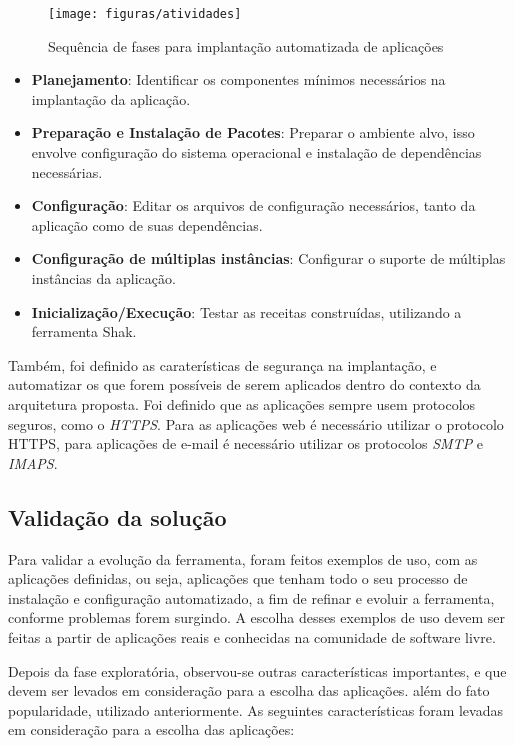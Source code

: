 \begin{figure}[h]
  \centering
  \texttt{[image: figuras/atividades]}
      \caption{Sequência de fases para implantação automatizada de aplicações}
  \label{fig:1}
\end{figure}

\begin{itemize}
  \item  \textbf{Planejamento}: Identificar os componentes mínimos necessários na implantação
 da aplicação.  
  \item  \textbf{Preparação e Instalação de Pacotes}: Preparar o ambiente alvo, 
isso envolve configuração do sistema operacional e instalação de dependências necessárias.
  \item  \textbf{Configuração}: Editar os arquivos de configuração necessários, tanto 
da aplicação como de suas dependências.
  \item  \textbf{Configuração de múltiplas instâncias}: Configurar o suporte de múltiplas instâncias
da aplicação.   
  \item  \textbf{Inicialização/Execução}: Testar as receitas construídas, utilizando
a ferramenta Shak. 
\end{itemize}

Também, foi definido as caraterísticas de segurança na implantação, e
automatizar os que forem possíveis de serem aplicados dentro do contexto da
arquitetura proposta. Foi definido que as aplicações sempre usem protocolos 
seguros, como o \textit{HTTPS}. 
Para as aplicações web é necessário utilizar o protocolo HTTPS, para aplicações
de e-mail é necessário utilizar os protocolos \textit{SMTP} e \textit{IMAPS}.

\subsection{Validação da solução}
\label{subsection:validacao}

Para validar a evolução da ferramenta, foram feitos exemplos de uso,
com as aplicações definidas, ou seja, aplicações que tenham todo o seu 
processo de instalação e configuração automatizado, a
fim de refinar e evoluir a ferramenta, conforme problemas forem surgindo. A escolha
desses exemplos de uso devem ser feitas a partir de aplicações reais e
conhecidas na comunidade de software livre. 

Depois da fase exploratória, observou-se outras características importantes, e que 
devem ser levados em consideração para a escolha das aplicações. além do fato 
popularidade, utilizado anteriormente. As seguintes 
características foram levadas em consideração para a escolha das aplicações:

